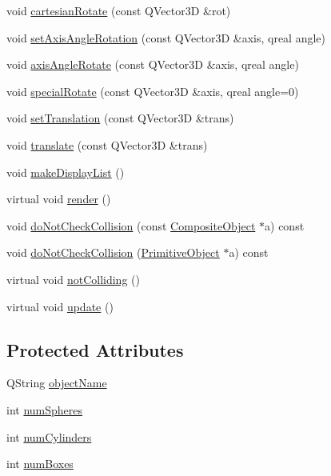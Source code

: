 \begin{DoxyCompactItemize}
\item 
void \hyperlink{class_robot_model_1_1_composite_object_a7c46e273df7d93cb51b9e16158469509}{cartesianRotate} (const QVector3D \&rot)
\item 
void \hyperlink{class_robot_model_1_1_composite_object_a718690c002e0f74b430a75a9c4dfdf85}{setAxisAngleRotation} (const QVector3D \&axis, qreal angle)
\item 
void \hyperlink{class_robot_model_1_1_composite_object_aa59e7af66ca1a0ced127d8f2b30c7a6d}{axisAngleRotate} (const QVector3D \&axis, qreal angle)
\item 
void \hyperlink{class_robot_model_1_1_composite_object_a3e9c7e78a85dc50e5327d5b5c99cc67e}{specialRotate} (const QVector3D \&axis, qreal angle=0)
\item 
void \hyperlink{class_robot_model_1_1_composite_object_a6a24e273234d2919c48d36182c409ffd}{setTranslation} (const QVector3D \&trans)
\item 
void \hyperlink{class_robot_model_1_1_composite_object_a7704da6de6211738327170423c1a3d83}{translate} (const QVector3D \&trans)
\item 
void \hyperlink{class_robot_model_1_1_composite_object_a780659c8a3d7803bf61ac55227ea0e3f}{makeDisplayList} ()
\item 
virtual void \hyperlink{class_robot_model_1_1_composite_object_a580d00dd3a303972d34183c07625aed7}{render} ()
\item 
void \hyperlink{class_robot_model_1_1_composite_object_a7eaa82d589f3698f600a6fee587e2e5c}{doNotCheckCollision} (const \hyperlink{class_robot_model_1_1_composite_object}{CompositeObject} $\ast$a) const 
\item 
void \hyperlink{class_robot_model_1_1_composite_object_a8728705ec34052de6d097fd2b76a6905}{doNotCheckCollision} (\hyperlink{class_robot_model_1_1_primitive_object}{PrimitiveObject} $\ast$a) const 
\item 
virtual void \hyperlink{class_robot_model_1_1_composite_object_ad54b0cbb3ed8ac1109ffcb6b587f8244}{notColliding} ()
\item 
virtual void \hyperlink{class_robot_model_1_1_composite_object_a9be8fd21b0ba19f4ad99d5767a30ea9e}{update} ()
\end{DoxyCompactItemize}
\subsection*{Protected Attributes}
\begin{DoxyCompactItemize}
\item 
QString \hyperlink{class_robot_model_1_1_composite_object_a4e833bb302d4a1a791211261251eff68}{objectName}
\item 
int \hyperlink{class_robot_model_1_1_composite_object_ad2f0b50dd12a6d6cba7d48c65266490a}{numSpheres}
\item 
int \hyperlink{class_robot_model_1_1_composite_object_a316bb31790aa7d8905a31523890187b3}{numCylinders}
\item 
int \hyperlink{class_robot_model_1_1_composite_object_a05fb383ad49f9da7da584b12804e4f19}{numBoxes}
\end{DoxyCompactItemize}


